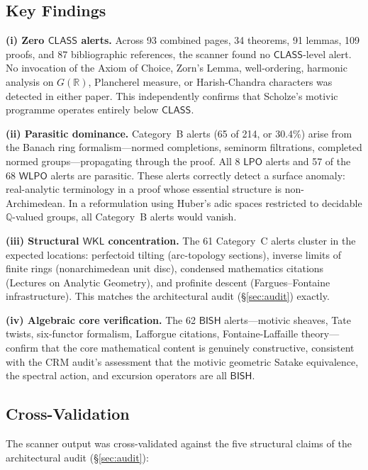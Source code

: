 \documentclass[11pt,a4paper]{article}
\theoremstyle{plain}
\theoremstyle{definition}
\newcommand{\BISH}{\textsf{BISH}}
\newcommand{\WKL}{\textsf{WKL}}
\newcommand{\WLPO}{\textsf{WLPO}}
\newcommand{\LPO}{\textsf{LPO}}
\newcommand{\CLASS}{\textsf{CLASS}}
\newcommand{\Q}{\mathbb{Q}}
\newcommand{\R}{\mathbb{R}}
\begin{document}
\subsection{Key Findings}

\textbf{(i) Zero $\CLASS$ alerts.} Across 93 combined pages, 34 theorems, 91 lemmas, 109 proofs, and 87 bibliographic references, the scanner found no $\CLASS$-level alert. No invocation of the Axiom of Choice, Zorn's Lemma, well-ordering, harmonic analysis on $G(\R)$, Plancherel measure, or Harish-Chandra characters was detected in either paper. This independently confirms that Scholze's motivic programme operates entirely below $\CLASS$.

\textbf{(ii) Parasitic dominance.} Category~B alerts (65 of 214, or 30.4\%) arise from the Banach ring formalism---normed completions, seminorm filtrations, completed normed groups---propagating through the proof. All 8 $\LPO$ alerts and 57 of the 68 $\WLPO$ alerts are parasitic. These alerts correctly detect a surface anomaly: real-analytic terminology in a proof whose essential structure is non-Archimedean. In a reformulation using Huber's adic spaces restricted to decidable $\Q$-valued groups, all Category~B alerts would vanish.

\textbf{(iii) Structural $\WKL$ concentration.} The 61 Category~C alerts cluster in the expected locations: perfectoid tilting (arc-topology sections), inverse limits of finite rings (nonarchimedean unit disc), condensed mathematics citations (Lectures on Analytic Geometry), and profinite descent (Fargues--Fontaine infrastructure). This matches the architectural audit (\S\ref{sec:audit}) exactly.

\textbf{(iv) Algebraic core verification.} The 62 $\BISH$ alerts---motivic sheaves, Tate twists, six-functor formalism, Lafforgue citations, Fontaine-Laffaille theory---confirm that the core mathematical content is genuinely constructive, consistent with the CRM audit's assessment that the motivic geometric Satake equivalence, the spectral action, and excursion operators are all $\BISH$.

\subsection{Cross-Validation}

The scanner output was cross-validated against the five structural claims of the architectural audit (\S\ref{sec:audit}):
\end{document}
